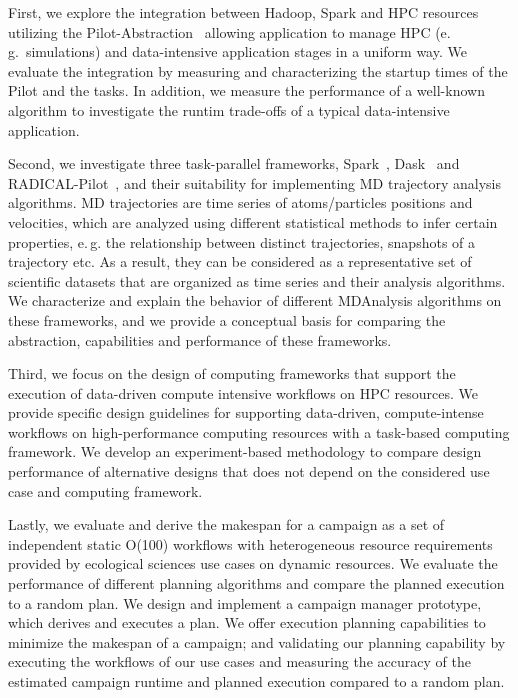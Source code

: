 First, we explore the integration between Hadoop, Spark and HPC resources utilizing the Pilot-Abstraction~\cite{luckow2012pstar} allowing application to manage HPC (e.\,g.\ simulations) and data-intensive application stages in a uniform way.
We evaluate the integration by measuring and characterizing the startup times of the Pilot and the tasks.
In addition, we measure the performance of a well-known  algorithm to investigate the runtim trade-offs of a typical data-intensive application.

Second, we investigate three task-parallel frameworks, Spark~\cite{zaharia2010spark}, Dask~\cite{rocklin2015dask} and RADICAL-Pilot~\cite{merzky2019using}, and their suitability for implementing MD trajectory analysis algorithms.
MD trajectories are time series of atoms/particles positions and velocities, which are analyzed using different statistical methods to infer certain properties, e.\,g. the relationship between distinct trajectories, snapshots of a trajectory etc.
As a result, they can be considered as a representative set of scientific datasets that are organized as time series and their analysis algorithms. 
We characterize and explain the behavior of different MDAnalysis algorithms on these frameworks, and we provide a conceptual basis for comparing the abstraction, capabilities and performance of these frameworks.

Third, we focus on the design of computing frameworks that support the execution of data-driven compute intensive workflows on HPC resources.
We provide specific design guidelines for supporting data-driven, compute-intense workflows on high-performance computing resources with a task-based computing framework.
We develop an experiment-based methodology to compare design performance of alternative designs that does not depend on the considered use case and computing framework.

Lastly, we evaluate and derive the makespan for a campaign as a set of independent static O(100) workflows with heterogeneous resource requirements provided by ecological sciences use cases on dynamic resources.
We evaluate the performance of different planning algorithms and compare the planned execution to a random plan.
We design and implement a campaign manager prototype, which derives and executes a plan.
We offer execution planning capabilities to minimize the makespan of a campaign; and validating our planning capability by executing the workflows of our use cases and measuring the accuracy of the estimated campaign runtime and planned execution compared to a random plan.

